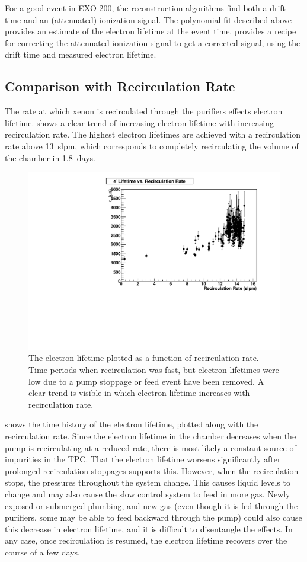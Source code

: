 \documentclass[herrin-thesis.tex]{subfiles}
\begin{document}
For a good event in EXO-200, the reconstruction algorithms find both a drift time and an (attenuated) ionization signal. The polynomial fit described above provides an estimate of the electron lifetime at the event time.  provides a recipe for correcting the attenuated ionization signal to get a corrected signal, using the drift time and measured electron lifetime.

\subsection{Comparison with Recirculation Rate}
The rate at which xenon is recirculated through the purifiers effects electron lifetime.  shows a clear trend of increasing electron lifetime with increasing recirculation rate. The highest electron lifetimes are achieved with a recirculation rate above \SI{13}{slpm}, which corresponds to completely recirculating the volume of the chamber in \SI{1.8}{days}.

\begin{figure}[htb]
\centering
\includegraphics[width=0.6\columnwidth]{./plots/el_vs_recirculation.pdf}
\caption[Electron lifetime vs. recirculation rate]{The electron lifetime plotted as a function of recirculation rate. Time periods when recirculation was fast, but electron lifetimes were low due to a pump stoppage or feed event have been removed. A clear trend is visible in which electron lifetime increases with recirculation rate.}
\label{fig:el_vs_recirculation}
\end{figure}

 shows the time history of the electron lifetime, plotted along with the recirculation rate. Since the electron lifetime in the chamber decreases when the pump is recirculating at a reduced rate, there is most likely a constant source of impurities in the TPC. That the electron lifetime worsens significantly after prolonged recirculation stoppages supports this. However, when the recirculation stops, the pressures throughout the system change. This causes liquid levels to change and may also cause the slow control system to feed in more gas. Newly exposed or submerged plumbing, and new gas (even though it is fed through the purifiers, some may be able to feed backward through the pump) could also cause this decrease in electron lifetime, and it is difficult to disentangle the effects. In any case, once recirculation is resumed, the electron lifetime recovers over the course of a few days.
\end{document}
